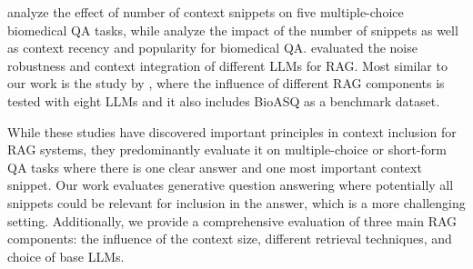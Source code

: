 \citet{xiong-etal-2024-benchmarking} analyze the effect of number of context snippets on five multiple-choice biomedical QA tasks, while \citet{vladika-matthes-2024-improving} analyze the impact of the number of snippets as well as context recency and popularity for biomedical QA. \citet{10.1609/aaai.v38i16.29728} evaluated the noise robustness and context integration of different LLMs for RAG. Most similar to our work is the study by \citet{hsia2024ragged}, where the influence of different RAG components is tested with eight LLMs and it also includes BioASQ as a benchmark dataset.

While these studies have discovered important principles in context inclusion for RAG systems, they predominantly evaluate it on multiple-choice or short-form QA tasks where there is one clear answer and one most important context snippet. Our work evaluates generative question answering where potentially all snippets could be relevant for inclusion in the answer, which is a more challenging setting. Additionally, we provide a comprehensive evaluation of three main RAG components: the influence of the context size, different retrieval techniques, and choice of base LLMs.

